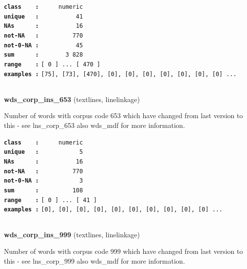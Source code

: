 \documentclass[]{article}
\begin{document}
\textbf{\texttt{class\ \ \ \ :}} \texttt{~~~~~numeric}\\
\textbf{\texttt{unique\ \ \ :}} \texttt{~~~~~~~~~~41}\\
\textbf{\texttt{NAs\ \ \ \ \ \ :}} \texttt{~~~~~~~~~~16}\\
\textbf{\texttt{not-NA\ \ \ :}} \texttt{~~~~~~~~~770}\\
\textbf{\texttt{not-0-NA\ :}} \texttt{~~~~~~~~~~45}\\
\textbf{\texttt{sum\ \ \ \ \ \ :}} \texttt{~~~~~~~3~828}\\
\textbf{\texttt{range\ \ \ \ :}}
\texttt{{[}\ 0\ {]}\ ...\ {[}\ 470\ {]}}\\
\textbf{\texttt{examples\ :}}
\texttt{{[}75{]},\ {[}73{]},\ {[}470{]},\ {[}0{]},\ {[}0{]},\ {[}0{]},\ {[}0{]},\ {[}0{]},\ {[}0{]},\ {[}0{]}\ ...}\\

~

\textbf{wds\_corp\_ins\_653} (textlines, linelinkage)

Number of words with corpus code 653 which have changed from last
version to this - see lns\_corp\_653 also wds\_mdf for more information.

\textbf{\texttt{class\ \ \ \ :}} \texttt{~~~~~numeric}\\
\textbf{\texttt{unique\ \ \ :}} \texttt{~~~~~~~~~~~5}\\
\textbf{\texttt{NAs\ \ \ \ \ \ :}} \texttt{~~~~~~~~~~16}\\
\textbf{\texttt{not-NA\ \ \ :}} \texttt{~~~~~~~~~770}\\
\textbf{\texttt{not-0-NA\ :}} \texttt{~~~~~~~~~~~3}\\
\textbf{\texttt{sum\ \ \ \ \ \ :}} \texttt{~~~~~~~~~108}\\
\textbf{\texttt{range\ \ \ \ :}}
\texttt{{[}\ 0\ {]}\ ...\ {[}\ 41\ {]}}\\
\textbf{\texttt{examples\ :}}
\texttt{{[}0{]},\ {[}0{]},\ {[}0{]},\ {[}0{]},\ {[}0{]},\ {[}0{]},\ {[}0{]},\ {[}0{]},\ {[}0{]},\ {[}0{]}\ ...}\\

~

\textbf{wds\_corp\_ins\_999} (textlines, linelinkage)

Number of words with corpus code 999 which have changed from last
version to this - see lns\_corp\_999 also wds\_mdf for more information.
\end{document}
